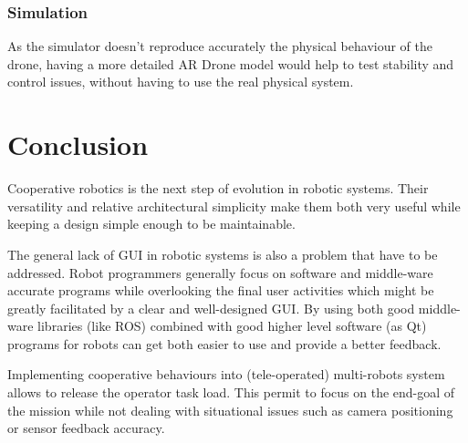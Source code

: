 \documentclass[11pt,a4paper]{article}
\begin{document}
\subsubsection{Simulation}
As the simulator doesn't reproduce accurately the physical behaviour of the drone, having a 
more detailed AR Drone model would help to test stability and control issues, without having 
to use the real physical system.

\clearpage
\section{Conclusion}
Cooperative robotics is the next step of evolution in robotic systems.
Their versatility and relative architectural simplicity make them both very useful while
keeping a design simple enough to be maintainable.

The general lack of GUI in robotic systems is also a problem that have to be addressed. 
Robot programmers generally focus on software and middle-ware accurate programs while 
overlooking the final user activities which might be greatly facilitated by a clear and 
well-designed GUI.
By using both good middle-ware libraries (like ROS) combined with good higher level
software (as Qt) programs for robots can get both easier to use and provide a better 
feedback.

Implementing cooperative behaviours into (tele-operated) multi-robots system allows to release 
the operator task load. This permit to focus on the end-goal of the mission while not dealing 
with situational issues such as camera positioning or sensor feedback accuracy.


\end{document}
